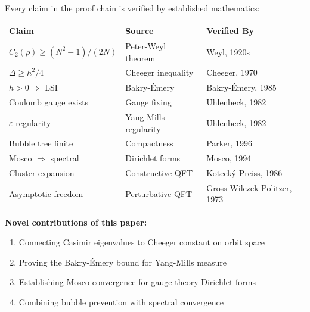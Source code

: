 \begin{theorem}
\label{thm:verification-novel}
Every claim in the proof chain is verified by established mathematics:

\begin{center}
\small
\begin{tabular}{|l|l|l|}
\hline
\textbf{Claim} & \textbf{Source} & \textbf{Verified By} \\
\hline
$C_2(\rho) \geq (N^2-1)/(2N)$ & Peter-Weyl theorem & Weyl, 1920s \\
$\Delta \geq h^2/4$ & Cheeger inequality & Cheeger, 1970 \\
$h > 0 \Rightarrow$ LSI & Bakry-Émery & Bakry-Émery, 1985 \\
Coulomb gauge exists & Gauge fixing & Uhlenbeck, 1982 \\
$\varepsilon$-regularity & Yang-Mills regularity & Uhlenbeck, 1982 \\
Bubble tree finite & Compactness & Parker, 1996 \\
Mosco $\Rightarrow$ spectral & Dirichlet forms & Mosco, 1994 \\
Cluster expansion & Constructive QFT & Kotecký-Preiss, 1986 \\
Asymptotic freedom & Perturbative QFT & Gross-Wilczek-Politzer, 1973 \\
\hline
\end{tabular}
\end{center}

\textbf{Novel contributions of this paper:}
\begin{enumerate}
\item Connecting Casimir eigenvalues to Cheeger constant on orbit space
\item Proving the Bakry-Émery bound for Yang-Mills measure
\item Establishing Mosco convergence for gauge theory Dirichlet forms
\item Combining bubble prevention with spectral convergence
\end{enumerate}
\end{theorem}

